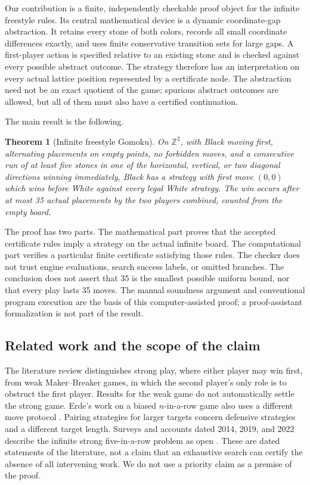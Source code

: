 \documentclass[11pt]{article}
\newtheorem{theorem}{Theorem}[section]
\theoremstyle{definition}
\theoremstyle{remark}
\newcommand{\Z}{\mathbb Z}
\begin{document}
Our contribution is a finite, independently checkable proof object for the
infinite freestyle rules. Its central mathematical device is a dynamic
coordinate-gap abstraction. It retains every stone of both colors, records
all small coordinate differences exactly, and uses finite conservative
transition sets for large gaps. A first-player action is specified relative
to an existing stone and is checked against every possible abstract outcome.
The strategy therefore has an interpretation on every actual lattice
position represented by a certificate node. The abstraction need not be an
exact quotient of the game; spurious abstract outcomes are allowed, but all
of them must also have a certified continuation.

The main result is the following.
\begin{theorem}[Infinite freestyle Gomoku]
\label{thm:main}
On $\Z^2$, with Black moving first, alternating placements on empty points,
no forbidden moves, and a consecutive run of at least five stones in one of
the horizontal, vertical, or two diagonal directions winning immediately,
Black has a strategy with first move $(0,0)$ which wins before White against
every legal White strategy. The win occurs after at most 35 actual placements
by the two players combined, counted from the empty board.
\end{theorem}

The proof has two parts. The mathematical part proves that the accepted
certificate rules imply a strategy on the actual infinite board. The
computational part verifies a particular finite certificate satisfying
those rules. The checker does not trust engine evaluations, search success
labels, or omitted branches. The conclusion does not assert that 35 is the
smallest possible uniform bound, nor that every play lasts 35 moves. The
manual soundness argument and conventional program execution are the basis
of this computer-assisted proof; a proof-assistant formalization is not part
of the result.

\subsection{Related work and the scope of the claim}
The literature review distinguishes strong play, where either player may
win first, from weak Maker--Breaker games, in which the second player's
only role is to obstruct the first player. Results for the weak game do not
automatically settle the strong game. Erde's work on a biased $n$-in-a-row
game also uses a different move protocol \cite{Erde2012}. Pairing strategies
for larger targets \cite{Gyorffy2019} concern defensive strategies and a
different target length. Surveys and accounts dated 2014, 2019, and 2022
describe the infinite strong five-in-a-row problem as open
\cite{Hefetz2014,Gyorffy2019,Pluhar2022}. These are dated statements of the
literature, not a claim that an exhaustive search can certify the absence
of all intervening work. We do not use a priority claim as a premise of the
proof.
\end{document}
